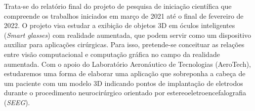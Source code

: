 \documentclass[Portugues]{projetoFAPESP}
\begin{document}

\geraTitulo

\folhaDeRosto

\begin{resumo}

Trata-se do relatório final do projeto de pesquisa de iniciação científica que compreende os trabalhos iniciados em março de 2021 até o final de fevereiro de 2022. O projeto visa estudar a exibição de objetos 3D em óculos inteligentes (\textit{Smart glasses}) com realidade aumentada, que podem servir como um dispositivo auxiliar para aplicações cirúrgicas. Para isso, pretende-se conceituar as relações entre visão computacional e computação gráfica no campo da realidade aumentada. Com o apoio do Laboratório Aeronáutico de Tecnologias (AeroTech), estudaremos uma forma de elaborar uma aplicação que sobreponha a cabeça de um paciente com um modelo 3D indicando pontos de implantação de eletrodos durante o procedimento neurocirúrgico orientado por estereoeletroencefalografia (\textit{SEEG}). 

  
\end{resumo}

\clearpage
\tableofcontents
\thispagestyle{empty}
\clearpage










\printbibliography[heading=bibintoc, title={Referências bibliográficas} ]
\end{document}
